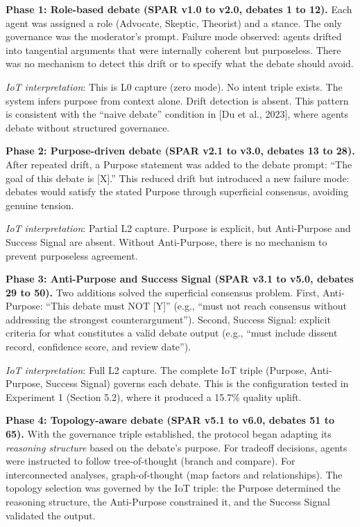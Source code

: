 \documentclass[11pt,a4paper]{article}
\begin{document}
\textbf{Phase 1: Role-based debate (SPAR v1.0 to v2.0, debates 1 to
12).} Each agent was assigned a role (Advocate, Skeptic, Theorist) and a
stance. The only governance was the moderator's prompt. Failure mode
observed: agents drifted into tangential arguments that were internally
coherent but purposeless. There was no mechanism to detect this drift or
to specify what the debate should avoid.

\emph{IoT interpretation}: This is L0 capture (zero mode). No intent
triple exists. The system infers purpose from context alone. Drift
detection is absent. This pattern is consistent with the ``naive
debate'' condition in {[}Du et al., 2023{]}, where agents debate without
structured governance.

\textbf{Phase 2: Purpose-driven debate (SPAR v2.1 to v3.0, debates 13 to
28).} After repeated drift, a Purpose statement was added to the debate
prompt: ``The goal of this debate is {[}X{]}.'' This reduced drift but
introduced a new failure mode: debates would satisfy the stated Purpose
through superficial consensus, avoiding genuine tension.

\emph{IoT interpretation}: Partial L2 capture. Purpose is explicit, but
Anti-Purpose and Success Signal are absent. Without Anti-Purpose, there
is no mechanism to prevent purposeless agreement.

\textbf{Phase 3: Anti-Purpose and Success Signal (SPAR v3.1 to v5.0,
debates 29 to 50).} Two additions solved the superficial consensus
problem. First, Anti-Purpose: ``This debate must NOT {[}Y{]}'' (e.g.,
``must not reach consensus without addressing the strongest
counterargument''). Second, Success Signal: explicit criteria for what
constitutes a valid debate output (e.g., ``must include dissent record,
confidence score, and review date'').

\emph{IoT interpretation}: Full L2 capture. The complete IoT triple
(Purpose, Anti-Purpose, Success Signal) governs each debate. This is the
configuration tested in Experiment 1 (Section 5.2), where it produced a
15.7\% quality uplift.

\textbf{Phase 4: Topology-aware debate (SPAR v5.1 to v6.0, debates 51 to
65).} With the governance triple established, the protocol began
adapting its \emph{reasoning structure} based on the debate's purpose.
For tradeoff decisions, agents were instructed to follow tree-of-thought
(branch and compare). For interconnected analyses, graph-of-thought (map
factors and relationships). The topology selection was governed by the
IoT triple: the Purpose determined the reasoning structure, the
Anti-Purpose constrained it, and the Success Signal validated the
output.
\end{document}
